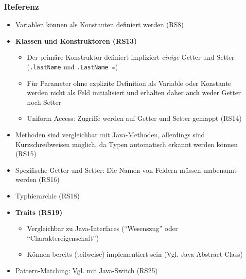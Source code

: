 \subsubsection{Referenz}
\begin{itemize}
	\item Variablen können als Konstanten definiert werden (RS8)
	\item \textbf{Klassen und Konstruktoren (RS13)}
	\begin{itemize}
		\item Der primäre Konstruktor definiert impliziert \textit{einige} Getter und Setter (\texttt{.lastName} und \texttt{.LastName =})
		\item Für Parameter ohne explizite Definition als Variable oder Konstante werden nicht als Feld initialisiert und erhalten daher auch weder Getter noch Setter
		\item Uniform Access: Zugriffe werden auf Getter und Setter gemappt (RS14)
	\end{itemize}
	\item Methoden sind vergleichbar mit Java-Methoden, allerdings sind Kurzschreibweisen möglich, da Typen automatisch erkannt werden können (RS15)
	\item Spezifische Getter und Setter: Die Namen von Feldern müssen umbenannt werden (RS16)
	\item Typhierarchie (RS18)
	\item \textbf{Traits (RS19)}
	\begin{itemize}
		\item Vergleichbar zu Java-Interfaces ("`Wesenszug"' oder "`Charaktereigenschaft"')
		\item Können bereits (teilweise) implementiert sein (Vgl. Java-Abstract-Class)
	\end{itemize}
	\item Pattern-Matching: Vgl. mit Java-Switch (RS25)
\end{itemize}

